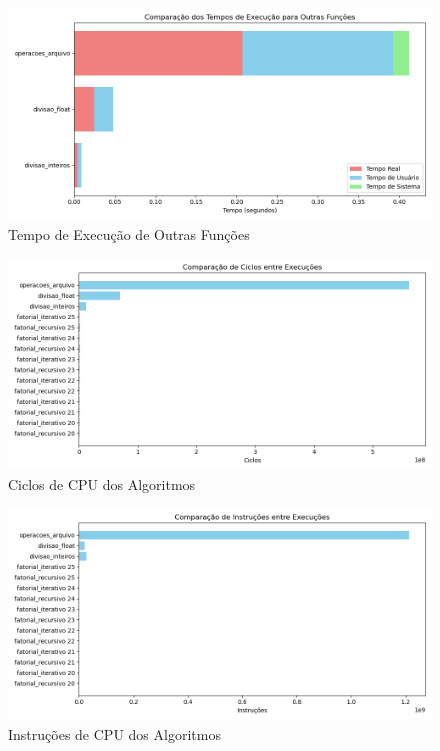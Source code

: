 \documentclass[12pt]{article}
\begin{document}
\begin{figure}[H]
    \centering
    \includegraphics[width=\linewidth]{resultados/tempo_execucao_outras.png}
    \caption{Tempo de Execução de Outras Funções}
    \label{fig:tempo_execucao_outras}
\end{figure}

\begin{figure}[H]
    \centering
    \includegraphics[width=\linewidth]{resultados/cycles.png}
    \caption{Ciclos de CPU dos Algoritmos}
    \label{fig:ciclos_cpu}
\end{figure}

\begin{figure}[H]
    \centering
    \includegraphics[width=\linewidth]{resultados/instructions.png}
    \caption{Instruções de CPU dos Algoritmos}
    \label{fig:instrucoes_cpu}
\end{figure}
\end{document}

